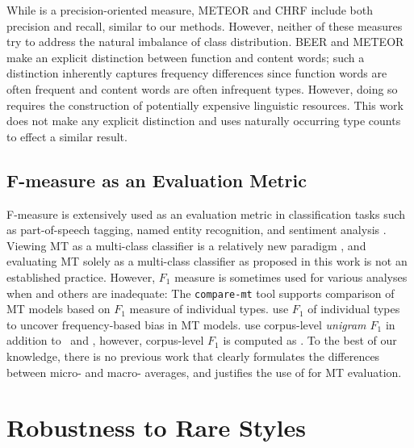 While \bleu{} is a precision-oriented measure, METEOR \cite{banerjee-lavie-2005-meteor} and CHRF \cite{popovic-2015-chrf} include both precision and recall, similar to our methods.
However, neither of these measures try to address the natural imbalance of class distribution. 
BEER \cite{stanojevic-simaan-2014-beer} and METEOR \cite{denkowski-lavie-2011-meteor1.3} make an explicit distinction between function and content words; such a distinction inherently captures frequency differences since function words are often frequent and content words are often infrequent types. However, doing so requires the construction of potentially expensive linguistic resources. This work does not make any explicit  distinction and uses naturally occurring type counts to effect a similar result.

\subsection{F-measure as an Evaluation Metric}
F-measure \cite{Rijsbergen-1979-F-meas, chinchor-1992-F-meas} is extensively used as an evaluation metric in classification tasks such as part-of-speech tagging, named entity recognition, and sentiment analysis \cite{derczynski-2016-f-score}.
Viewing MT as a multi-class classifier is a relatively new paradigm \cite{gowda-may-2020-finding}, and evaluating MT solely as a multi-class classifier as proposed in this work is not an established practice.
However, $F_1$ measure is sometimes used for various analyses when \bleu{} and others are inadequate: The \texttt{compare-mt} tool \citep{neubig-etal-2019-compareMT} supports comparison of MT models based on $F_1$ measure of individual types.
\citet{gowda-may-2020-finding} use $F_1$ of individual types to uncover frequency-based bias in MT models.
\citet{sennrich-etal-2016-bpe} use corpus-level \textit{unigram $F_1$} in addition to \bleu\ and \chrf{}, however, corpus-level $F_1$ is computed as .
To the best of our knowledge, there is no previous work that clearly formulates the differences between micro- and macro- averages, and justifies the use of  for MT evaluation. 

\section{Robustness to Rare Styles }


